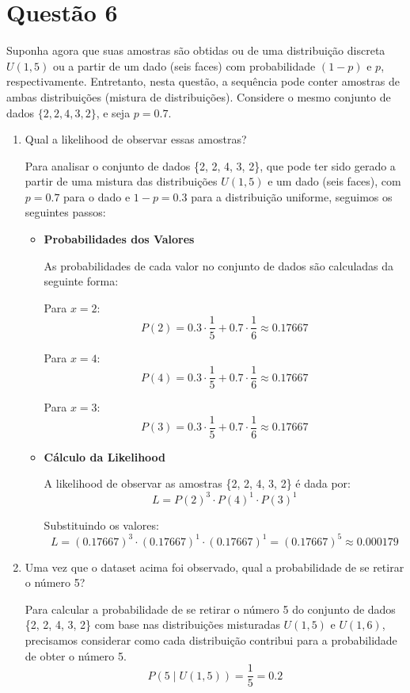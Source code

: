 \documentclass[12 pt]{article}
\begin{document}
\section*{Questão 6}
Suponha agora que suas amostras são obtidas ou de uma distribuição discreta $U(1, 5)$ ou a partir de um dado (seis faces) com probabilidade $(1 - p)$ e $p$, respectivamente. Entretanto, nesta questão, a sequência pode conter amostras de ambas distribuições (mistura de distribuições). Considere o mesmo conjunto de dados $\{2, 2, 4, 3, 2\}$, e seja $p = 0.7$.
\begin{enumerate}
    \newpage
    \item Qual a likelihood de observar essas amostras?
    \begin{tcolorbox}[colback=white, colframe=black, title=Resposta:]
Para analisar o conjunto de dados \{2, 2, 4, 3, 2\}, que pode ter sido gerado a partir de uma mistura das distribuições \( U(1,5) \) e um dado (seis faces), com \( p = 0.7 \) para o dado e \( 1 - p = 0.3 \) para a distribuição uniforme, seguimos os seguintes passos:

\begin{itemize}
    \item \textbf{Probabilidades dos Valores}  

    As probabilidades de cada valor no conjunto de dados são calculadas da seguinte forma:
    
    Para \( x = 2 \):
    \[
    P(2) = 0.3 \cdot \frac{1}{5} + 0.7 \cdot \frac{1}{6} \approx 0.17667
    \]
    
    Para \( x = 4 \):
    \[
    P(4) = 0.3 \cdot \frac{1}{5} + 0.7 \cdot \frac{1}{6} \approx 0.17667
    \]
    
    Para \( x = 3 \):
    \[
    P(3) = 0.3 \cdot \frac{1}{5} + 0.7 \cdot \frac{1}{6} \approx 0.17667
    \]
    
    \item \textbf{Cálculo da Likelihood}  
    
    A likelihood de observar as amostras \{2, 2, 4, 3, 2\} é dada por:
    \[
    L = P(2)^3 \cdot P(4)^1 \cdot P(3)^1
    \]
    
    Substituindo os valores:
    \[
    L = (0.17667)^3 \cdot (0.17667)^1 \cdot (0.17667)^1 = (0.17667)^5 \approx 0.000179
    \]
\end{itemize}



    \end{tcolorbox}
    \newpage
    \item Uma vez que o dataset acima foi observado, qual a probabilidade de se retirar o número 5?
    \begin{tcolorbox}[colback=white, colframe=black, title=Resposta:]
        Para calcular a probabilidade de se retirar o número 5 do conjunto de dados \{2, 2, 4, 3, 2\} com base nas distribuições misturadas \( U(1,5) \) e \( U(1,6) \), precisamos considerar como cada distribuição contribui para a probabilidade de obter o número 5.
   \[
   P(5 \mid U(1,5)) = \frac{1}{5} = 0.2
   \]


\end{tcolorbox}
\end{enumerate}
\end{document}
